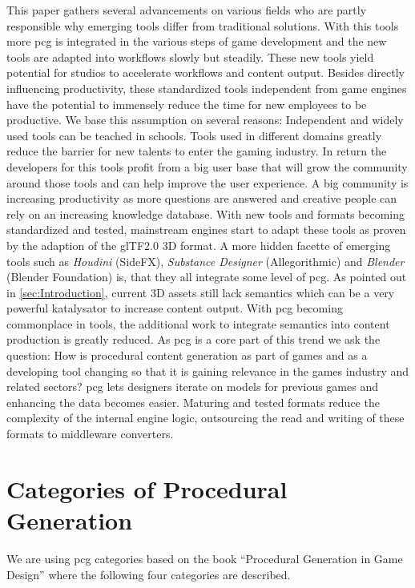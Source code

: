 \documentclass[10pt,a4paper]{article}
\begin{document}
\begin{multicols}{2}
This paper gathers several advancements on various fields who are partly responsible why emerging tools differ from traditional solutions. With this tools more \gls{pcg} is integrated in the various steps of game development and the new tools are adapted into workflows slowly but steadily. These new tools yield potential for studios to accelerate workflows and content output. Besides directly influencing productivity, these standardized tools independent from game engines have the potential to immensely reduce the time for new employees to be productive. We base this assumption on several reasons: Independent and widely used tools can be teached in schools. Tools used in different domains greatly reduce the barrier for new talents to enter the gaming industry. In return the developers for this tools profit from a big user base that will grow the community around those tools and can help improve the user experience. A big community is increasing productivity as more questions are answered and creative people can rely on an increasing knowledge database. With new tools and formats becoming standardized and tested, mainstream engines start to adapt these tools as proven by the adaption of the glTF2.0 3D format\cite{Group2018}. A more hidden facette of emerging tools such as \textit{Houdini} (SideFX), \textit{Substance Designer} (Allegorithmic) and \textit{Blender} (Blender Foundation) is, that they all integrate some level of \gls{pcg}. As pointed out in \autoref{sec:Introduction}, current 3D assets still lack semantics which can be a very powerful katalysator to increase content output. With \gls{pcg} becoming commonplace in tools, the additional work to integrate semantics into content production is greatly reduced. As \gls{pcg} is a core part of this trend we ask the question: How is procedural content generation as part of games and as a developing tool changing so that it is gaining relevance in the games industry and related sectors? \gls{pcg} lets designers iterate on models for previous games and enhancing the data becomes easier. Maturing and tested formats reduce the complexity of the internal engine logic, outsourcing the read and writing of these formats to middleware converters.
\end{multicols}

\section{Categories of Procedural Generation}\label{sec:categories}
\begin{multicols}{2}
We are using \gls{pcg} categories based on the book “Procedural Generation in Game Design”\citep[p.~3]{Short:2017:PGG:3161477} where the following four categories are described.
\end{multicols}
\end{document}
